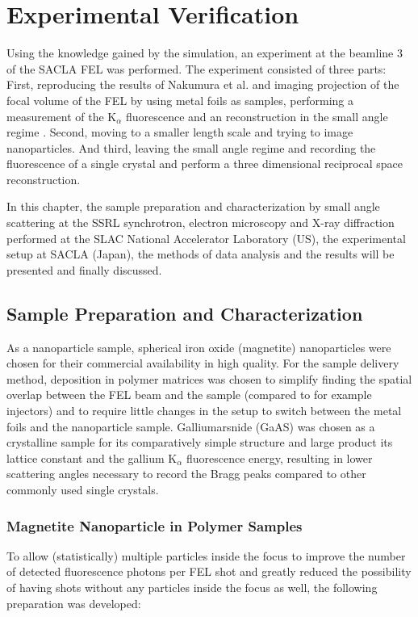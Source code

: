\chapter{Experimental Verification}
\label{chap:experiment}

Using the knowledge gained by the simulation, an experiment at the beamline 3 of the SACLA FEL was performed. The experiment consisted of three parts: First, reproducing the results of Nakumura et al. and imaging projection of the focal volume of the FEL by using metal foils as samples, performing a measurement of the K$_\alpha$  fluorescence and an reconstruction in the small angle regime \cite{nakumura2020}.  Second, moving to a smaller length scale and trying to image nanoparticles. And third, leaving the small angle regime and recording the fluorescence of a single crystal and perform a three dimensional reciprocal space reconstruction. 

In this chapter, the sample preparation and characterization by small angle scattering at the SSRL synchrotron, electron microscopy and X-ray diffraction performed at the SLAC National Accelerator  Laboratory (US), the experimental setup at SACLA (Japan), the methods of data analysis and the results will be presented and finally discussed.

\section{Sample Preparation and Characterization}
As a nanoparticle sample, spherical iron oxide  (magnetite) nanoparticles were chosen for their commercial availability in high quality. For the sample delivery method, deposition in polymer matrices was chosen to simplify finding the spatial overlap between the FEL beam and the sample (compared to for example injectors) and to require little changes in the setup to switch between the metal foils and the nanoparticle sample. 
Galliumarsnide (GaAS) was chosen as a crystalline sample for its comparatively simple structure and large product its lattice constant and the gallium K${_\alpha}$ fluorescence energy, resulting in lower scattering angles necessary to record the Bragg peaks compared to other commonly used single crystals. 

\subsection{Magnetite Nanoparticle in Polymer Samples}
To allow (statistically) multiple particles inside the focus to improve the number of detected fluorescence photons per FEL shot and greatly reduced the possibility of having shots without any particles inside the focus as well, the following preparation was developed:


